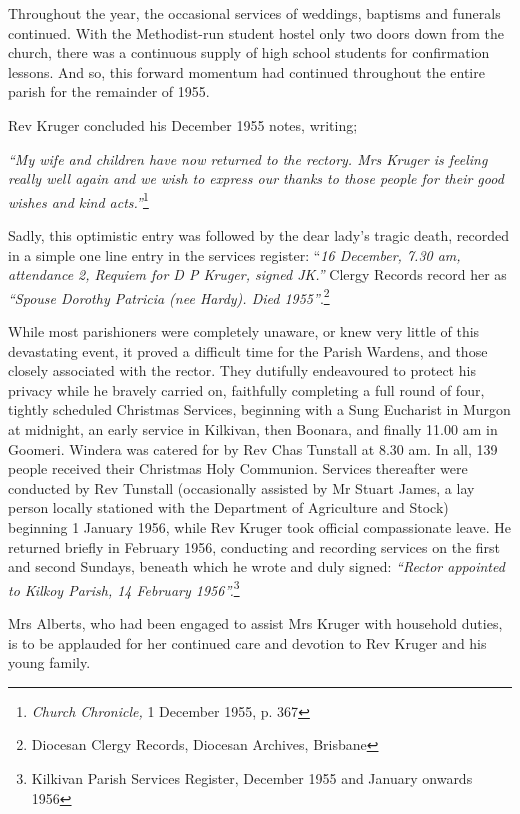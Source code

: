 Throughout the year, the occasional services of weddings, baptisms and funerals continued. With the Methodist-run student hostel only two doors down from the church, there was a continuous supply of high school students for confirmation lessons. And so, this forward momentum had continued throughout the entire parish for the remainder of 1955.



Rev Kruger concluded his December 1955 notes, writing;



\emph{``My wife and children have now returned to the rectory. Mrs Kruger is feeling really well again and we wish to express our thanks to those people for their good wishes and kind acts.''}\footnote{\emph{Church Chronicle,} 1 December 1955, p. 367}


\smallskip


Sadly, this optimistic entry was followed by the dear lady's tragic death, recorded in a simple one line entry in the services register: ``\emph{16 December, 7.30 am, attendance 2, Requiem for D P Kruger, signed JK.''} Clergy Records record her as \emph{``Spouse Dorothy Patricia (nee Hardy). Died 1955''}.\footnote{Diocesan Clergy Records, Diocesan Archives, Brisbane}


\smallskip


While most parishioners were completely unaware, or knew very little of this devastating event, it proved a difficult time for the Parish Wardens, and those closely associated with the rector. They dutifully endeavoured to protect his privacy while he bravely carried on, faithfully completing a full round of four, tightly scheduled Christmas Services, beginning with a Sung Eucharist in Murgon at midnight, an early service in Kilkivan, then Boonara, and finally 11.00 am in Goomeri. Windera was catered for by Rev Chas Tunstall at 8.30 am. In all, 139 people received their Christmas Holy Communion. Services thereafter were conducted by Rev Tunstall (occasionally assisted by Mr Stuart James, a lay person locally stationed with the Department of Agriculture and Stock) beginning 1 January 1956, while Rev Kruger took official compassionate leave. He returned briefly in February 1956, conducting and recording services on the first and second Sundays, beneath which he wrote and duly signed: \emph{``Rector appointed to Kilkoy Parish, 14 February 1956''.}\footnote{Kilkivan Parish Services Register, December 1955 and January onwards 1956}


Mrs Alberts, who had been engaged to assist Mrs Kruger with household duties, is to be applauded for her continued care and devotion to Rev Kruger and his young family.



